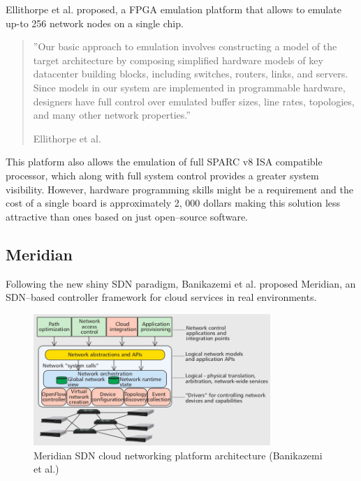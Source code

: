 \documentclass[12pt,english,oneside]{book}
\begin{document}
Ellithorpe et al.\cite{box} proposed, a FPGA emulation platform that allows to emulate up-to 256 network nodes on a single chip.
\begin{quotation}
''Our basic approach to emulation involves constructing a model of the target architecture by composing simplified hardware models
of key datacenter building blocks, including switches, routers, links, and servers. Since models in our system are implemented in programmable hardware, designers have full control over emulated buffer sizes, line rates, topologies, and many other network properties.''

\hfill Ellithorpe et al.\cite{box}
\end{quotation}

This platform also allows the emulation of full SPARC v8 ISA compatible processor, which along with full system control provides a greater system visibility.
However, hardware programming skills might be a requirement and the cost of a single board is approximately 2, 000 dollars making this solution less attractive than ones based on just open--source software.

\subsection{Meridian}
\hspace{0.6cm}

Following the new shiny SDN paradigm, Banikazemi et al.\cite{meridian} proposed Meridian, an SDN--based controller
framework for cloud services in real environments.

\begin{figure}[htbp]
        \centering
        \includegraphics[width=0.8\textwidth]{figures/meridian_arch.png}
        \caption{Meridian SDN cloud networking platform architecture (Banikazemi et al.\cite{meridian})}
        \label{fig:meridian_arch}
\end{figure}
\end{document}
